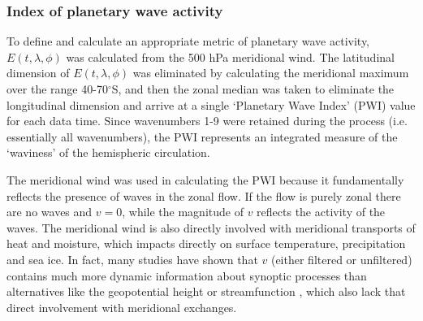 \subsubsection{Index of planetary wave activity}

To define and calculate an appropriate metric of planetary wave activity, $E(t,\lambda,\phi)$ was calculated from the 500 hPa meridional wind. The latitudinal dimension of $E(t,\lambda,\phi)$ was eliminated by calculating the meridional maximum over the range 40-70$^{\circ}$S, and then the zonal median was taken to eliminate the longitudinal dimension and arrive at a single `Planetary Wave Index' (PWI) value for each data time. Since wavenumbers 1-9 were retained during the process (i.e. essentially all wavenumbers), the PWI represents an integrated measure of the `waviness' of the hemispheric circulation.

The meridional wind was used in calculating the PWI because it fundamentally reflects the presence of waves in the zonal flow. If the flow is purely zonal there are no waves and $v = 0$, while the magnitude of $v$ reflects the activity of the waves. The meridional wind is also directly involved with meridional transports of heat and moisture, which impacts directly on surface temperature, precipitation and sea ice. In fact, many studies have shown that $v$ (either filtered or unfiltered) contains much more dynamic information about synoptic processes than alternatives like the geopotential height or streamfunction \citep[e.g.][]{Berbery1996,Hoskins2005,Petoukhov2013}, which also lack that direct involvement with meridional exchanges. 

